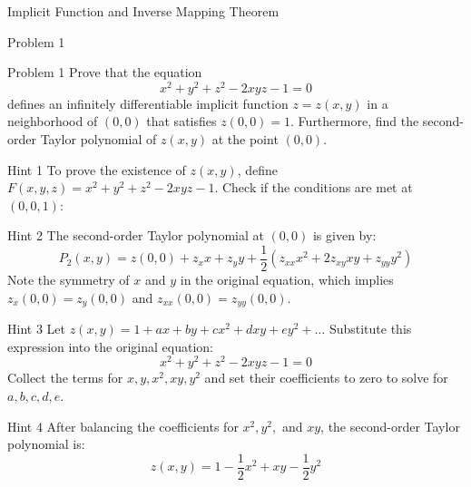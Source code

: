 \documentclass{beamer}
\begin{document}
\begin{section}{Implicit Function and Inverse Mapping Theorem}

\begin{subsection}{Problem 1}
    \begin{frame}
        \begin{block}{Problem 1}
            Prove that the equation
            $$
            x^2 + y^2 + z^2 - 2xyz - 1 = 0
            $$
            defines an infinitely differentiable implicit function $z = z(x,y)$ in a neighborhood of $(0,0)$ that satisfies $z(0,0) = 1$. Furthermore, find the second-order Taylor polynomial of $z(x,y)$ at the point $(0,0)$.
        \end{block}
    \end{frame}

    \begin{frame}
        \begin{block}{Hint 1}
            To prove the existence of $z(x,y)$, define $F(x,y,z) = x^2 + y^2 + z^2 - 2xyz - 1$. Check if the conditions are met at $(0,0,1)$:
        \end{block}

        \pause
        \vspace{1em}
        \begin{block}{Hint 2}
            The second-order Taylor polynomial at $(0,0)$ is given by:
            $$
            P_2(x,y) = z(0,0) + z_x x + z_y y + \frac{1}{2}(z_{xx}x^2 + 2z_{xy}xy + z_{yy}y^2)
            $$
            Note the symmetry of $x$ and $y$ in the original equation, which implies $z_x(0,0) = z_y(0,0)$ and $z_{xx}(0,0) = z_{yy}(0,0)$.
        \end{block}
    \end{frame}

    \begin{frame}
        \begin{block}{Hint 3}
            Let $z(x,y) = 1 + ax + by + cx^2 + dxy + ey^2 + \dots$ 
            Substitute this expression into the original equation:
            $$
            x^2 + y^2 + z^2 - 2xyz - 1 = 0
            $$
            Collect the terms for $x, y, x^2, xy, y^2$ and set their coefficients to zero to solve for $a, b, c, d, e$.
        \end{block}

        \pause
        \vspace{1em}
        \begin{block}{Hint 4}
            After balancing the coefficients for $x^2, y^2,$ and $xy$, the second-order Taylor polynomial is:
            $$
            z(x,y) = 1 - \frac{1}{2}x^2 + xy - \frac{1}{2}y^2
            $$
        \end{block}
    \end{frame}
\end{subsection}

\end{section}
\end{document}
